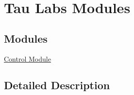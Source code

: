 \hypertarget{group___modules}{\section{Tau Labs Modules}
\label{group___modules}
}
\subsection*{Modules}
\begin{DoxyCompactItemize}
\item 
\hyperlink{group___control}{Control Module}
\end{DoxyCompactItemize}


\subsection{Detailed Description}
